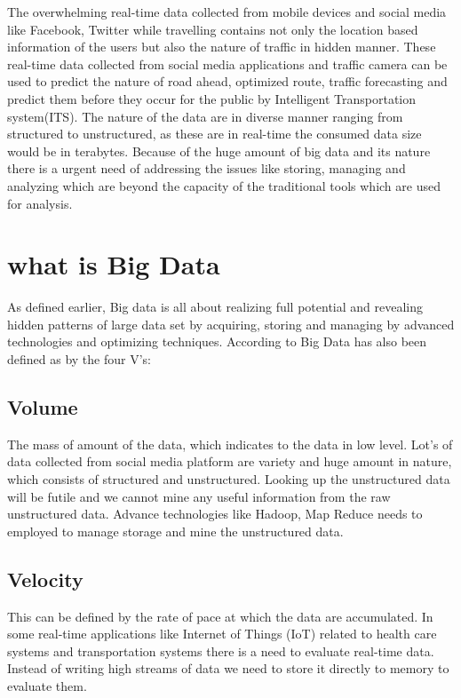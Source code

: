 \documentclass[sigconf]{acmart}
\begin{document}
The overwhelming real-time data collected from mobile devices and social media like Facebook, Twitter while travelling contains not only the location based information of the users but also the nature of traffic in hidden manner. These real-time data collected from social media applications and traffic camera can be used to predict the nature of road ahead, optimized route, traffic forecasting and predict them before they occur for the public by Intelligent Transportation system(ITS)\cite{its}. The nature of the data are in diverse manner ranging from structured to unstructured, as these are in real-time the consumed data size would be in terabytes. Because of the huge amount of big data and its nature there is a urgent need of addressing the issues like storing, managing and analyzing which are beyond the capacity of the traditional tools which are used for analysis.


\section{what is Big Data}

As defined earlier, Big data is all about realizing full potential and revealing hidden patterns of large data set by acquiring, storing and managing by advanced technologies and optimizing techniques. According to \cite{bigdata} Big Data has also been defined as by the four V's:

\subsection{Volume}

The mass of amount of the data, which indicates to the data in low level. Lot's of data collected from social media platform are variety and huge amount in nature, which consists of structured and unstructured. Looking up the unstructured data will be futile and we cannot mine any useful information from the raw unstructured data. Advance technologies like Hadoop, Map Reduce \cite{mapreduce,hadoop} needs to employed to manage storage and mine the unstructured data.

\subsection{Velocity}

This can be defined by the rate of pace at which the data are accumulated. In some real-time applications like Internet of Things (IoT) related to health care systems and transportation systems there is a need to evaluate real-time data. Instead of writing high streams of data we need to store it directly to memory to evaluate them. 
\end{document}
